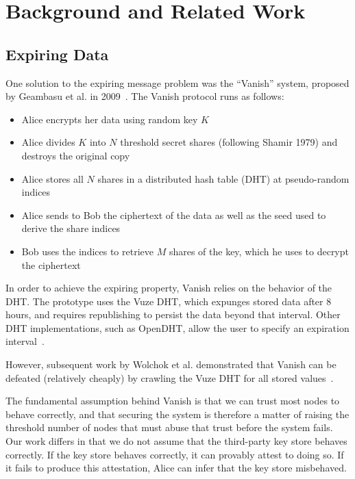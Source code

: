 \documentclass{article}
\begin{document}
\section{Background and Related Work}

\subsection{Expiring Data}

One solution to the expiring message problem was the ``Vanish'' system, proposed by Geambasu et al. in 2009~\cite{vanish}. The Vanish protocol runs as follows:

\begin{itemize}
\item Alice encrypts her data using random key $K$
\item Alice divides $K$ into $N$ threshold secret shares (following Shamir 1979) and destroys the original copy
\item Alice stores all $N$ shares in a distributed hash table (DHT) at pseudo-random indices
\item Alice sends to Bob the ciphertext of the data as well as the seed used to derive the share indices
\item Bob uses the indices to retrieve $M$ shares of the key, which he uses to decrypt the ciphertext
\end{itemize}

In order to achieve the expiring property, Vanish relies on the behavior of the DHT. The prototype uses the Vuze DHT, which expunges stored data after 8 hours, and requires republishing to persist the data beyond that interval. Other DHT implementations, such as OpenDHT, allow the user to specify an expiration interval~\cite{vanish}.

However, subsequent work by Wolchok et al. demonstrated that Vanish can be defeated (relatively cheaply) by crawling the Vuze DHT for all stored values~\cite{defeat-vanish}.

The fundamental assumption behind Vanish is that we can trust most nodes to behave correctly, and that securing the system is therefore a matter of raising the threshold number of nodes that must abuse that trust before the system fails. Our work differs in that we do not assume that the third-party key store behaves correctly. If the key store behaves correctly, it can provably attest to doing so. If it fails to produce this attestation, Alice can infer that the key store misbehaved.
\end{document}
